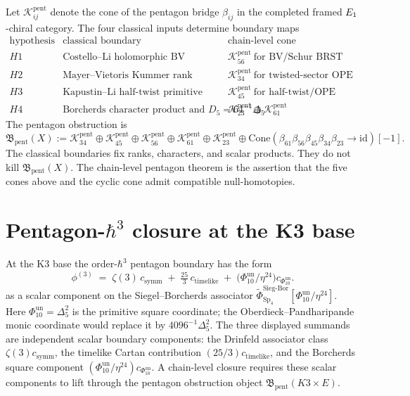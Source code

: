 Let \(\mathcal K_{ij}^{\mathrm{pent}}\) denote the cone of the pentagon
bridge \(\beta_{ij}\) in the completed framed \(E_{1}\)-chiral category.
The four classical inputs determine boundary maps
\[
\begin{array}{c|c|c}
\text{hypothesis} & \text{classical boundary} & \text{chain-level cone}\\
\hline
H1 &
\text{Costello--Li holomorphic BV factorisation algebra} &
\mathcal K_{56}^{\mathrm{pent}}\ \text{for BV/Schur BRST compatibility}\\
H2 &
\text{Mayer--Vietoris Kummer rank halving} &
\mathcal K_{34}^{\mathrm{pent}}\ \text{for twisted-sector OPE}\\
H3 &
\text{Kapustin--Li half-twist primitive sector} &
\mathcal K_{45}^{\mathrm{pent}}\ \text{for half-twist/OPE compatibility}\\
H4 &
\text{Borcherds character product and }D_5=64^{-1}\Delta_5 &
\mathcal K_{23}^{\mathrm{pent}}\oplus
\mathcal K_{61}^{\mathrm{pent}}
\end{array}
\]
The pentagon obstruction is
\[
 \mathfrak B_{\mathrm{pent}}(X):=
 \mathcal K_{34}^{\mathrm{pent}}\oplus
 \mathcal K_{45}^{\mathrm{pent}}\oplus
 \mathcal K_{56}^{\mathrm{pent}}\oplus
 \mathcal K_{61}^{\mathrm{pent}}\oplus
 \mathcal K_{23}^{\mathrm{pent}}\oplus
 \mathrm{Cone}\!\left(
 \beta_{61}\beta_{56}\beta_{45}\beta_{34}\beta_{23}
 \to \mathrm{id}
 \right)[-1].
\]
The classical boundaries fix ranks, characters, and scalar products.
They do not kill \(\mathfrak B_{\mathrm{pent}}(X)\). The chain-level
pentagon theorem is the assertion that the five cones above and the
cyclic cone admit compatible null-homotopies.


\section{Pentagon-\texorpdfstring{$\hbar^3$}{hbar-3} closure at the K3 base}
\label{sec:cyc-pentagon-k3-base}

\begin{remark}
\label{rem:cyc-pentagon-hbar3-coboundary}
At the K3 base the order-\(\hbar^3\) pentagon boundary has the form
\[
\phi^{(3)}
\;=\;
\zeta(3)\, c_{\mathrm{symm}}
\;+\; \tfrac{25}{3}\, c_{\mathrm{timelike}}
\;+\;
\bigl(\Phi_{10}^{\mathrm{un}}/\eta^{24}\bigr)c_{\Phi_{10}^{\mathrm{un}}} .
\]
as a scalar component on the Siegel--Borcherds associator
\(\widetilde\Phi^{\mathrm{Sieg\text{-}Bor}}_{\mathrm{Sp}_4}
[\Phi_{10}^{\mathrm{un}}/\eta^{24}]\).
Here
\(\Phi_{10}^{\mathrm{un}}=\Delta_5^2\) is the primitive square
coordinate; the Oberdieck--Pandharipande monic coordinate would replace it by
\(4096^{-1}\Delta_5^2\). The three displayed summands are independent
scalar boundary components: the Drinfeld associator class
\(\zeta(3)c_{\mathrm{symm}}\), the timelike Cartan contribution
\((25/3)c_{\mathrm{timelike}}\), and the Borcherds square component
\((\Phi_{10}^{\mathrm{un}}/\eta^{24})c_{\Phi_{10}^{\mathrm{un}}}\). A chain-level
closure requires these scalar components to lift through the pentagon
obstruction object \(\mathfrak B_{\mathrm{pent}}(K3\times E)\).
\end{remark}


